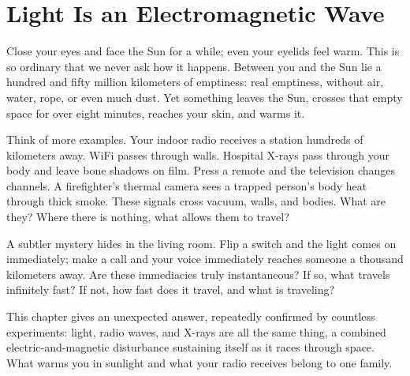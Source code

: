 \chapter{Light Is an Electromagnetic Wave}


\begin{mainline}
Close your eyes and face the Sun for a while; even your eyelids feel warm. This is so ordinary that we never ask how it happens. Between you and the Sun lie a hundred and fifty million kilometers of emptiness: real emptiness, without air, water, rope, or even much dust. Yet something leaves the Sun, crosses that empty space for over eight minutes, reaches your skin, and warms it.

Think of more examples. Your indoor radio receives a station hundreds of kilometers away. WiFi passes through walls. Hospital X-rays pass through your body and leave bone shadows on film. Press a remote and the television changes channels. A firefighter's thermal camera sees a trapped person's body heat through thick smoke. These signals cross vacuum, walls, and bodies. What are they? Where there is nothing, what allows them to travel?

A subtler mystery hides in the living room. Flip a switch and the light comes on immediately; make a call and your voice immediately reaches someone a thousand kilometers away. Are these immediacies truly instantaneous? If so, what travels infinitely fast? If not, how fast does it travel, and what is traveling?

This chapter gives an unexpected answer, repeatedly confirmed by countless experiments: light, radio waves, and X-rays are all the same thing, a combined electric-and-magnetic disturbance sustaining itself as it races through space. What warms you in sunlight and what your radio receives belong to one family.
\end{mainline}



